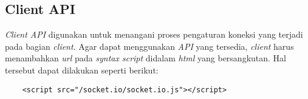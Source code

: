 \begin{enumerate}
	
\end{enumerate}

\subsection{Client API}
\textit{Client API} digunakan untuk menangani proses pengaturan koneksi yang terjadi pada bagian \textit{client}. Agar dapat menggunakan \textit{API} yang tersedia, \textit{client} harus menambahkan \textit{url} pada \textit{syntax script} didalam \textit{html} yang bersangkutan. Hal tersebut dapat dilakukan seperti berikut:

\begin{lstlisting}
	<script src="/socket.io/socket.io.js"></script>
\end{lstlisting}


